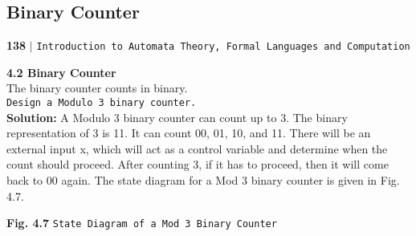 \documentclass[9pt]{beamer}
\begin{document}
\begin{frame}
\section*{Binary Counter}
\begin{flushleft}
    \textbf{138}\hspace*{0.1cm} \textbf{$|$} \hspace*{0.1cm} \texttt{Introduction to Automata Theory, Formal Languages and Computation}
  \end{flushleft}

  \vspace*{0.5cm}
  \textbf{4.2 Binary Counter}\\

  \vspace*{0.2cm}
  The binary counter counts in binary.\\

   \vspace*{0.2cm}
  \hspace*{0.1cm} \texttt{Design a Modulo 3 binary counter.}\\

  \textbf{Solution:} A Modulo 3 binary counter can count up to 3. The binary representation of 3 is 11. It can count
00, 01, 10, and 11. There will be an external input x, which will act as a control variable and determine
when the count should proceed. After counting 3, if it has to proceed, then it will come back to 00 again.
The state diagram for a Mod 3 binary counter is given in Fig. 4.7.\\
\end{frame}

\begin{frame}
\begin{center}
\end{center}
\begin{center}
\textbf{Fig. 4.7} \hspace*{0.3cm} \texttt{State Diagram of a Mod 3 Binary Counter}
\end{center}
\end{frame}
\end{document}
